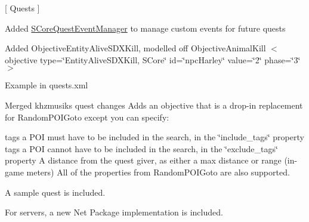 \mbox{[} Quests \mbox{]}
\begin{DoxyItemize}
\item Added \mbox{\hyperlink{class_s_core_quest_event_manager}{SCore\+Quest\+Event\+Manager}} to manage custom events for future quests
\item Added Objective\+Entity\+Alive\+SDXKill, modelled off Objective\+Animal\+Kill $<$objective type=\char`\"{}\+Entity\+Alive\+SDXKill, SCore\char`\"{} id=\char`\"{}npc\+Harley\char`\"{} value=\char`\"{}2\char`\"{} phase=\char`\"{}3\char`\"{}$>$
\begin{DoxyItemize}
\item Example in quests.\+xml
\end{DoxyItemize}
\item Merged khzmusik\textquotesingle{}s quest changes Adds an objective that is a drop-\/in replacement for Random\+POIGoto except you can specify\+:

tags a POI must have to be included in the search, in the \char`\"{}include\+\_\+tags\char`\"{} property tags a POI cannot have to be included in the search, in the \char`\"{}exclude\+\_\+tags\char`\"{} property A distance from the quest giver, as either a max distance or range (in-\/game meters) All of the properties from Random\+POIGoto are also supported.

A sample quest is included.

For servers, a new Net Package implementation is included.
\end{DoxyItemize}

